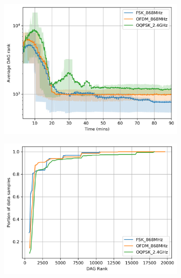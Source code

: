 \documentclass[journal]{IEEEtran}
\begin{document}
\begin{figure}[ht!]
	\centering
	\begin{subfigure}{0.6\columnwidth}
	\centering
	\includegraphics[width=1\columnwidth]{avg_dagRank_plot.png}
    \label{fig:dagrank_time}
	\end{subfigure}
	\begin{subfigure}{0.6\columnwidth}
		\centering
    	\includegraphics[width=01\columnwidth]{dagRank_cdf_plot_full_all}
        \label{fig:dagrank_cdf}
	\end{subfigure}%
    ~ 
	\begin{subfigure}{0.6\columnwidth}

\end{subfigure}
\end{figure}
\end{document}
